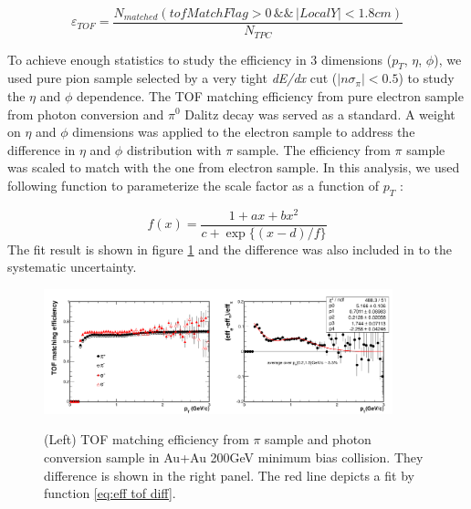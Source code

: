 \begin{equation}
\varepsilon_{TOF}=\frac{N_{matched}(tofMatchFlag>0\,\&\&\,|LocalY|<1.8cm)}{N_{TPC}}\label{eq:eff TOF}
\end{equation}


To achieve enough statistics to study the efficiency in 3 dimensions
($p_{T}$, $\eta$, $\phi$), we used pure pion sample selected by
a very tight \emph{dE/dx }cut ($|n\sigma_{\pi}|<0.5$)$ $ to study
the $\eta$ and $\phi$ dependence. The TOF matching efficiency from
pure electron sample from photon conversion and $\pi^{0}$ Dalitz
decay was served as a standard. A weight on $\eta$ and $\phi$ dimensions
was applied to the electron sample to address the difference in $\eta$
and $\phi$ distribution with $\pi$ sample. The efficiency from $\pi$
sample was scaled to match with the one from electron sample. In this
analysis, we used following function to parameterize the scale factor
as a function of $p_{T}$ :

\begin{equation}
f(x)=\frac{1+ax+bx^{2}}{c+\exp\{(x-d)/f\}}\label{eq:eff tof diff}
\end{equation}
The fit result is shown in figure \ref{fig: TOF diff} and the difference
was also included in to the systematic uncertainty.

\begin{figure}
\begin{centering}
\includegraphics[width=0.45\textwidth]{fig/3.Analysis/Efficiency/TOF/Diff_phe_pi_rff}\includegraphics[width=0.45\textwidth]{fig/3.Analysis/Efficiency/TOF/SysErr_Tof}
\par\end{centering}

\protect\caption{(Left) TOF matching efficiency from $\pi$ sample and photon conversion
sample in Au+Au 200GeV minimum bias collision. They difference is
shown in the right panel. The red line depicts a fit by function \ref{eq:eff tof diff}.}


\label{fig: TOF diff}
\end{figure}


